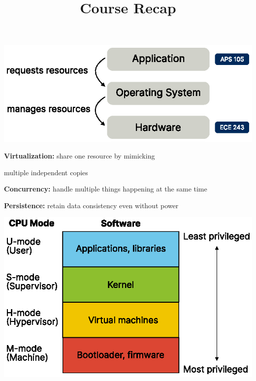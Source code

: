 

\title{Course Recap}



\begin{frame}
  \titlepage
\end{frame}

\begin{slide}
  

  \centering

  \includegraphics{../01-why-operating-systems/operating-system-overview.eps}

\end{slide}

\begin{slide}
  

  \textbf{Virtualization:} share one resource by mimicking
  
  \leftspace{}multiple independent copies
  \bigskip

  \textbf{Concurrency:} handle multiple things happening at the same time
  \bigskip

  \textbf{Persistence:} retain data consistency even without power
\end{slide}

\begin{slide}
  

  \includegraphics{../02-kernels/cpu-modes.eps}

\end{slide}

